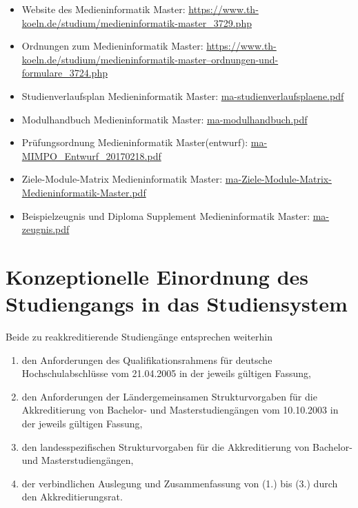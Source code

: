 \begin{itemize}
\tightlist
\item
  Website des Medieninformatik Master:
  \url{https://www.th-koeln.de/studium/medieninformatik-master\_3729.php}
\item
  Ordnungen zum Medieninformatik Master:
  \href{https://www.th-koeln.de/studium/medieninformatik-master--ordnungen-und-formulare_3724.php}{https://www.th-koeln.de/studium/medieninformatik-master--ordnungen-und-formulare\_3724.php}
\item
  Studienverlaufsplan Medieninformatik Master:
  \href{../anhaenge/ma-studienverlaufsplaene.pdf}{ma-studienverlaufsplaene.pdf}
\item
  Modulhandbuch Medieninformatik Master:
  \href{../anhaenge/ma-modulhandbuch.pdf}{ma-modulhandbuch.pdf}
\item
  Prüfungsordnung Medieninformatik Master(entwurf):
  \href{../anhaenge/ma-MIMPO_Entwurf_20170218.pdf}{ma-MIMPO\_Entwurf\_20170218.pdf}
\item
  Ziele-Module-Matrix Medieninformatik Master:
  \href{../anhaenge/ma-Ziele-Module-Matrix-Medieninformatik-Master.pdf}{ma-Ziele-Module-Matrix-Medieninformatik-Master.pdf}
\item
  Beispielzeugnis und Diploma Supplement Medieninformatik Master:
  \href{../anhaenge/ma-zeugnis.pdf}{ma-zeugnis.pdf}
\end{itemize}

\chapter{Konzeptionelle Einordnung des Studiengangs in das
Studiensystem}\label{konzeptionelle-einordnung-des-studiengangs-in-das-studiensystem}

Beide zu reakkreditierende Studiengänge entsprechen weiterhin

\begin{enumerate}
\def\labelenumi{\arabic{enumi}.}
\item
  den Anforderungen des Qualifikationsrahmens für deutsche
  Hochschulabschlüsse vom 21.04.2005 in der jeweils gültigen Fassung,
\item
  den Anforderungen der Ländergemeinsamen Strukturvorgaben für die
  Akkreditierung von Bachelor- und Masterstudiengängen vom 10.10.2003 in
  der jeweils gültigen Fassung,
\item
  den landesspezifischen Strukturvorgaben für die Akkreditierung von
  Bachelor- und Masterstudiengängen,
\item
  der verbindlichen Auslegung und Zusammenfassung von (1.) bis (3.)
  durch den Akkreditierungsrat.
\end{enumerate}

